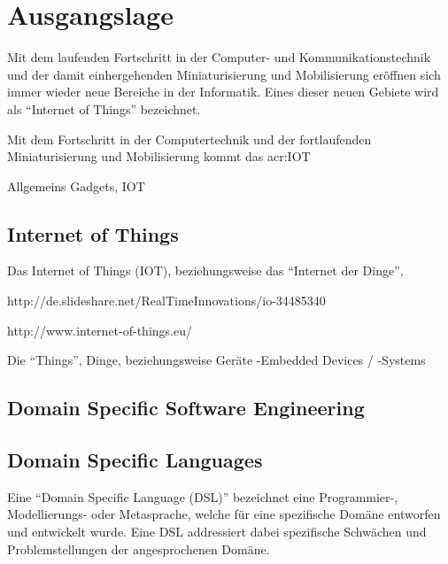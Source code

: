 \chapter{Ausgangslage}

Mit dem laufenden Fortschritt in der Computer- und Kommunikationstechnik und der damit einhergehenden Miniaturisierung und Mobilisierung eröffnen sich immer wieder neue Bereiche in der Informatik. Eines dieser neuen Gebiete wird als "`Internet of Things"' bezeichnet.

Mit dem Fortschritt in der Computertechnik und der fortlaufenden Miniaturisierung und Mobilisierung kommt das \gls{acr:IOT}

Allgemeins Gadgets, IOT



\section{Internet of Things}
Das Internet of Things (IOT), beziehungsweise das "`Internet der Dinge"', 

http://de.slideshare.net/RealTimeInnovations/io-34485340

http://www.internet-of-things.eu/


Die "`Things"', Dinge, beziehungsweise Geräte
-Embedded Devices / -Systems

\section{Domain Specific Software Engineering}


\section{Domain Specific Languages}
Eine "`Domain Specific Language (DSL)"' bezeichnet eine Programmier-, Modellierungs- oder Metasprache, welche für eine spezifische Domäne entworfen und entwickelt wurde. Eine DSL addressiert dabei spezifische Schwächen und Problemstellungen der angesprochenen Domäne.



